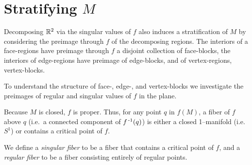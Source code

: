 \section{Stratifying $M$}

Decomposing $\mathbb{R}^2$ via the singular values of $f$ also induces a stratification of $M$ by considering the preimage through $f$ of the decomposing regions.
The interiors of a face-regions have preimage through $f$ a disjoint collection of face-blocks, the interiors of edge-regions have preimage of edge-blocks, and of vertex-regions, vertex-blocks.

To understand the structure of face-, edge-, and vertex-blocks we investigate the preimages of regular and singular values of $f$ in the plane.
\begin{defn}
	Because $M$ is closed, $f$ is proper.
	Thus, for any point $q$ in $f(M)$, a fiber of $f$ above $q$ (i.e.\ a connected component of $f^{\,\text{-}1}(q)$) is either a closed 1--manifold (i.e.\ $S^1$) or contains a critical point of $f$.
	
	We define a \emph{singular fiber} to be a fiber that contains a critical point of $f$, and a \emph{regular fiber} to be a fiber consisting entirely of regular points.	
\end{defn}
